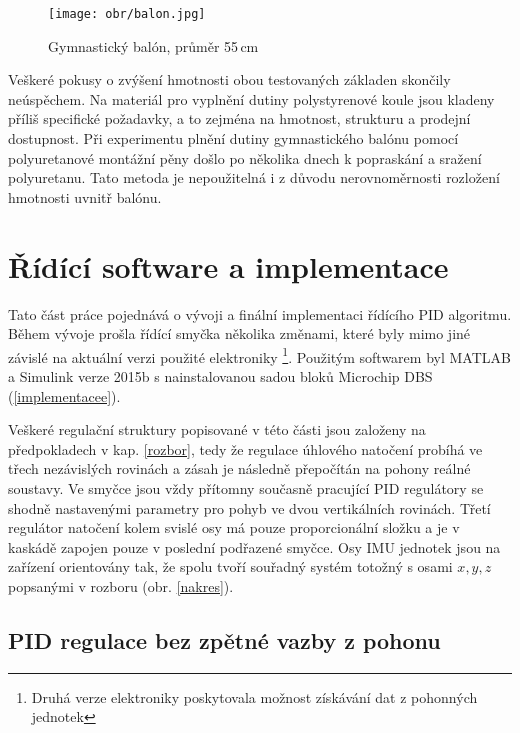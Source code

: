 \begin{figure}[htb]
\begin{center}
\texttt{[image: obr/balon.jpg]}
\end{center}
\vspace{5mm}
\caption{Gymnastický balón, průměr 55\,cm \cite{gymm}}
\label{cocka}
\end{figure}

Veškeré pokusy o zvýšení hmotnosti obou testovaných základen skončily neúspěchem. Na materiál pro vyplnění dutiny polystyrenové koule jsou kladeny příliš specifické požadavky, a to zejména na hmotnost, strukturu a prodejní dostupnost. Při experimentu plnění dutiny gymnastického balónu pomocí polyuretanové montážní pěny došlo po několika dnech k popraskání a sražení polyuretanu. Tato metoda je nepoužitelná i z důvodu nerovnoměrnosti rozložení hmotnosti uvnitř balónu.

\newpage

\section{Řídící software a implementace}
\label{rizeni}

Tato část práce pojednává o vývoji a finální implementaci řídícího PID algoritmu. Během vývoje prošla řídící smyčka několika změnami, které byly mimo jiné závislé na aktuální verzi použité elektroniky \footnote{Druhá verze elektroniky poskytovala možnost získávání dat z pohonných jednotek}. Použitým softwarem byl MATLAB a Simulink verze 2015b s nainstalovanou sadou bloků Microchip DBS (\ref{implementacee}). 

Veškeré regulační struktury popisované v této části jsou založeny na předpokladech v kap.\,\,\ref{rozbor}, tedy že regulace úhlového natočení probíhá ve třech nezávislých rovinách a zásah je následně přepočítán na pohony reálné soustavy. Ve smyčce jsou vždy přítomny současně pracující PID regulátory se shodně nastavenými parametry pro pohyb ve dvou vertikálních rovinách. Třetí regulátor natočení kolem svislé osy má pouze proporcionální složku a je v kaskádě zapojen pouze v poslední podřazené smyčce. Osy IMU jednotek jsou na zařízení orientovány tak, že spolu tvoří souřadný systém totožný s osami $x, y, z$ popsanými v rozboru (obr. \ref{nakres}). 

\subsection{PID regulace bez zpětné vazby z pohonu}
\label{PID}

